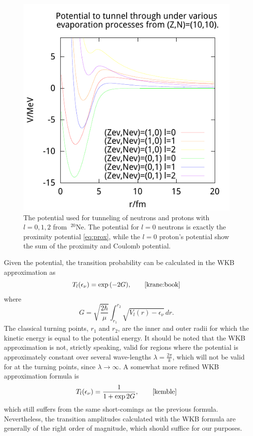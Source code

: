\begin{figure}
\begin{center}
\includegraphics{figures/pot/np-potZ10N10.pdf}
\caption{\label{fig:np-Z10N10} The potential used for tunneling of neutrons and protons with $l=0,1,2$ from $~^{20}\mathrm{Ne}$. The potential for $l=0$ neutrons is exactly the proximity potential \eqref{eq:prox}, while the $l=0$ proton's potential show the sum of the proximity and Coulomb potential. }
\end{center}
\end{figure}

Given the potential, the transition probability can be calculated in the WKB approximation as 
\begin{equation}
T_l(\epsilon_\nu) = \exp{(-2G)},\qquad\cite{krane:book}
\end{equation}
where 
\begin{equation}
G=\sqrt{\frac{2\hbar}{\mu}} \int_{r_1}^{r_2} \sqrt{V_l(r)-\epsilon_{\nu}}\,dr.
\end{equation}
The classical turning points, $r_1$ and $r_2$, are the inner and outer radii for which the kinetic energy is equal to the potential energy. It should be noted that the WKB approximation is not, strictly speaking, valid for regions where the potential is approximately constant over several wave-lengths $\lambda=\frac{2\pi}{k}$, which will not be valid for at the turning points, since $\lambda \to \infty$. 
A somewhat more refined WKB approximation formula is
\begin{equation}
T_l(\epsilon_\nu) = \frac{1}{1+\exp{2G}},\qquad\cite{kemble}
\end{equation}
 which still suffers from the same short-comings as the previous formula. Nevertheless, the transition amplitudes calculated with the WKB formula are generally of the right order of magnitude, which should suffice for our purposes\cite{2011arXiv1106.1065N}.

